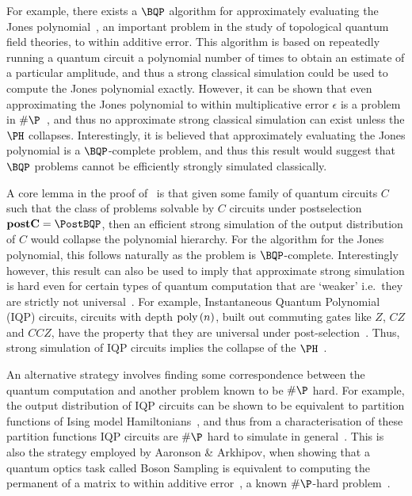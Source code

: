 For example, there exists a $\BQP$ algorithm for approximately evaluating the Jones polynomial~\cite{Aharonov2007}, an important problem in the study of topological quantum field theories, to within additive error. This algorithm is based on repeatedly running a quantum circuit a polynomial number of times to obtain an estimate of a particular amplitude, and thus a strong classical simulation could be used to compute the Jones polynomial exactly. However, it can be shown that even approximating the Jones polynomial to within multiplicative error $\epsilon$ is a problem in $\#\P$~\cite{Kuperberg2009}, and thus no approximate strong classical simulation can exist unless the $\PH$ collapses. Interestingly, it is believed that approximately evaluating the Jones polynomial is a $\BQP$-complete problem, and thus this result would suggest that $\BQP$ problems cannot be efficiently strongly simulated classically.\par
A core lemma in the proof of~\cite{Kuperberg2009} is that given some family of quantum circuits $C$ such that the class of problems solvable by $C$ circuits under postselection $\mathbf{postC}=\PostBQP$, then an efficient strong simulation of the output distribution of $C$ would collapse the polynomial hierarchy. For the algorithm for the Jones polynomial, this follows naturally as the problem is $\BQP$-complete. Interestingly however, this result can also be used to imply that approximate strong simulation is hard even for certain types of quantum computation that are `weaker' i.e.\ they are strictly not universal~\cite{Aaronson2010}. For example, Instantaneous Quantum Polynomial (IQP) circuits, circuits with depth $\text{poly}\left(n\right)$, built out commuting gates like $Z$, $CZ$ and $CCZ$, have the property that they are universal under post-selection~\cite{Bremner2011}. Thus, strong simulation of IQP circuits implies the collapse of the $\PH$~\cite{Goldberg2014}.\par
An alternative strategy involves finding some correspondence between the quantum computation and another problem known to be $\#\P$ hard. For example, the output distribution of IQP circuits can be shown to be equivalent to partition functions of Ising model Hamiltonians~\cite{Fujii2017}, and thus from a characterisation of these partition functions IQP circuits are $\#\P$ hard to simulate in general~\cite{Goldberg2014}. This is also the strategy employed by Aaronson \& Arkhipov, when showing that a quantum optics task called Boson Sampling is equivalent to computing the permanent of a matrix to within additive error~\cite{Aaronson2010}, a known $\#\P$-hard problem~\cite{Valiant1979}.
